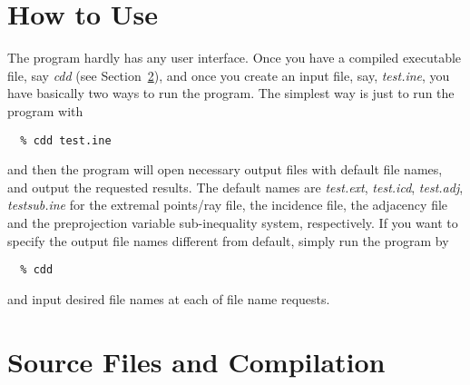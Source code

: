 \section{How to Use}  \label{HOWTO}

The program hardly has any user interface.  Once you have a compiled
executable file, say {\em cdd\/} (see Section~\ref{CAUTIONS}), 
and once you create an input file,
say, {\em test.ine\/}, you have basically two ways to run the program.
The simplest way is just to run the program with 
\begin{verbatim}
  % cdd test.ine
\end{verbatim}
and then the program will open necessary output files with
default file names, and output the requested results.
The default names are {\em test.ext\/}, {\em test.icd\/}, {\em test.adj\/},
{\em testsub.ine\/} for the extremal points/ray file, the incidence
file, the adjacency file and the preprojection variable sub-inequality
system, respectively.  If you want to specify the output file names
different from default, simply run the program by
\begin{verbatim}
  % cdd
\end{verbatim}
and input desired file names at each of file name requests.

\section{Source Files and Compilation}  \label{CAUTIONS}

